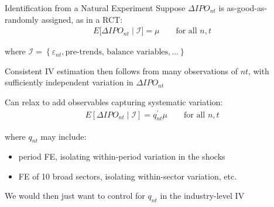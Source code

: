 \documentclass{beamer}
\begin{document}
\begin{frame}{Identification from a Natural Experiment}
\vspace{-0.2cm}
Suppose $\Delta IPO_{nt}$ is as-good-as-randomly assigned, as in a RCT: 
\vspace{-0.3cm}
\begin{align*}
E[\Delta IPO_{nt}\mid \mathcal{I]}=\mu\qquad\text{for all }n,t
\end{align*}

\vspace{-0.3cm}where $\mathcal{I}=\left\{\varepsilon_{nt},\text{pre-trends, balance variables},\dots\right\}$
\pause{}\smallskip

Consistent IV estimation then follows from many observations of $nt$, with sufficiently independent variation in $\Delta IPO_{nt}$
\pause{}\smallskip

Can relax to add observables capturing systematic variation:
\vspace{-0.3cm}
\begin{align*}
E[\Delta IPO_{nt}\mid \mathcal{I}]=q_{nt}^\prime\mu\qquad\text{for all }n,t
\end{align*}

\vspace{-0.3cm}where $q_{nt}$ may include:
\smallskip
\begin{itemize}
\item period FE, isolating within-period variation in the shocks \smallskip
\item FE of 10 broad sectors, isolating within-sector variation, etc. 
\end{itemize}\smallskip\pause{}
We would then just want to control for $q_{nt}$ in the industry-level IV
\end{frame}
\end{document}
